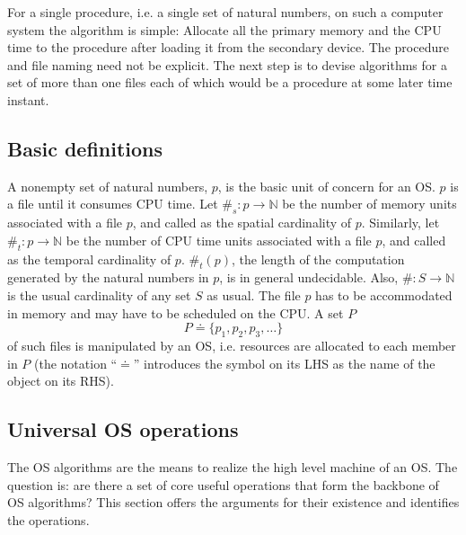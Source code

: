 \documentclass[draft]{article}
\def\names{\doteq}
\begin{document}
For a single procedure, i.e.  a single set of natural numbers, on such
a computer  system the algorithm  is simple: Allocate all  the primary
memory and  the CPU time  to the procedure  after loading it  from the
secondary device.  The procedure and file naming need not be explicit.
The next step is to devise algorithms for a set of more than one files
each of which would be a  procedure at some later time instant.

\subsection{Basic definitions}
\label{sec:basic:defns}

A nonempty set  of natural numbers, $p$, is the  basic unit of concern
for an OS.   $p$ is a file  until it consumes CPU time.   Let $\#_s: p
\rightarrow \mathbb{N}$ be the  number of memory units associated with
a file $p$, and called  as the spatial cardinality of $p$.  Similarly,
let $\#_t: p  \rightarrow \mathbb{N}$ be the number  of CPU time units
associated with a file $p$,  and called as the temporal cardinality of
$p$.   $\#_t(p)$,  the length  of  the  computation  generated by  the
natural  numbers in  $p$, is  in  general undecidable.   Also, $\#:  S
\rightarrow \mathbb{N}$  is the  usual cardinality of  any set  $S$ as
usual.  The file $p$ has to  be accommodated in memory and may have to
be scheduled on the CPU.  A set $P$
\begin{equation}
  \label{eq:basic:set:of:files}
  P \names \{p_1, p_2, p_3, \ldots\}
\end{equation}
of such files is manipulated by an OS, i.e. resources are allocated to
each member in $P$ (the notation ``$\names$'' introduces the symbol on
its LHS as the name of the object on its RHS).

\subsection{Universal OS operations}
\label{sec:universal:os:functions}

The OS algorithms  are the means to realize the  high level machine of
an OS.   The question is:  are there a  set of core  useful operations
that  form the  backbone of  OS algorithms?   This section  offers the
arguments for their existence and identifies the operations.
\end{document}
